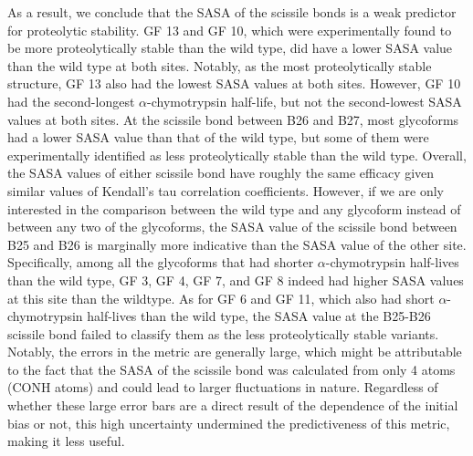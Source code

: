 \documentclass[9pt]{elife}
\begin{document}
As a result, we conclude that the SASA of the scissile bonds is a weak predictor for proteolytic stability. GF 13 and GF 10, which were experimentally found to be more proteolytically stable than the wild type, did have a lower SASA value than the wild type at both sites. Notably, as the most proteolytically stable structure, GF 13 also had the lowest SASA values at both sites. However, GF 10 had the second-longest $\alpha$-chymotrypsin half-life, but not the second-lowest SASA values at both sites. At the scissile bond between B26 and B27, most glycoforms had a lower SASA value than that of the wild type, but some of them were experimentally identified as less proteolytically stable than the wild type. Overall, the SASA values of either scissile bond have roughly the same efficacy given similar values of Kendall’s tau correlation coefficients. However, if we are only interested in the comparison between the wild type and any glycoform instead of between any two of the glycoforms, the SASA value of the scissile bond between B25 and B26 is marginally more indicative than the SASA value of the other site. Specifically, among all the glycoforms that had shorter $\alpha$-chymotrypsin half-lives than the wild type, GF 3, GF 4, GF 7, and GF 8 indeed had higher SASA values at this site than the wildtype. As for GF 6 and GF 11, which also had short $\alpha$-chymotrypsin half-lives than the wild type, the SASA value at the B25-B26 scissile bond failed to classify them as the less proteolytically stable variants. Notably, the errors in the metric are generally large, which might be attributable to the fact that the SASA of the scissile bond was calculated from only 4 atoms (CONH atoms) and could lead to larger fluctuations in nature. Regardless of whether these large error bars are a direct result of the dependence of the initial bias or not, this high uncertainty undermined the predictiveness of this metric, making it less useful.
\end{document}
